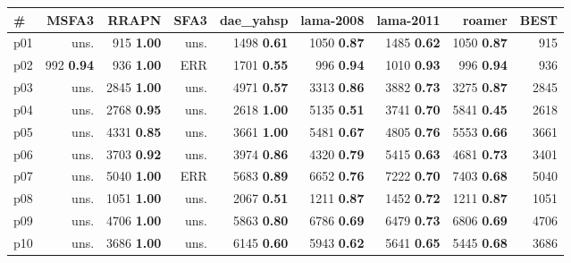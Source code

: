 \begin{tabular}{|l|rrrrrrr|r|}
\hline
\textbf{\#} & \textbf{MSFA3} & \textbf{RRAPN} & \textbf{SFA3} & \textbf{dae\_yahsp} & \textbf{lama-2008} & \textbf{lama-2011} & \textbf{roamer} & \textbf{BEST}\\
\hline
p01 & uns. & {\footnotesize 915} \textbf{1.00} & uns. & {\footnotesize 1498} \textbf{0.61} & {\footnotesize 1050} \textbf{0.87} & {\footnotesize 1485} \textbf{0.62} & {\footnotesize 1050} \textbf{0.87} & 915\\
p02 & {\footnotesize 992} \textbf{0.94} & {\footnotesize 936} \textbf{1.00} & ERR & {\footnotesize 1701} \textbf{0.55} & {\footnotesize 996} \textbf{0.94} & {\footnotesize 1010} \textbf{0.93} & {\footnotesize 996} \textbf{0.94} & 936\\
p03 & uns. & {\footnotesize 2845} \textbf{1.00} & uns. & {\footnotesize 4971} \textbf{0.57} & {\footnotesize 3313} \textbf{0.86} & {\footnotesize 3882} \textbf{0.73} & {\footnotesize 3275} \textbf{0.87} & 2845\\
p04 & uns. & {\footnotesize 2768} \textbf{0.95} & uns. & {\footnotesize 2618} \textbf{1.00} & {\footnotesize 5135} \textbf{0.51} & {\footnotesize 3741} \textbf{0.70} & {\footnotesize 5841} \textbf{0.45} & 2618\\
p05 & uns. & {\footnotesize 4331} \textbf{0.85} & uns. & {\footnotesize 3661} \textbf{1.00} & {\footnotesize 5481} \textbf{0.67} & {\footnotesize 4805} \textbf{0.76} & {\footnotesize 5553} \textbf{0.66} & 3661\\
p06 & uns. & {\footnotesize 3703} \textbf{0.92} & uns. & {\footnotesize 3974} \textbf{0.86} & {\footnotesize 4320} \textbf{0.79} & {\footnotesize 5415} \textbf{0.63} & {\footnotesize 4681} \textbf{0.73} & 3401\\
p07 & uns. & {\footnotesize 5040} \textbf{1.00} & ERR & {\footnotesize 5683} \textbf{0.89} & {\footnotesize 6652} \textbf{0.76} & {\footnotesize 7222} \textbf{0.70} & {\footnotesize 7403} \textbf{0.68} & 5040\\
p08 & uns. & {\footnotesize 1051} \textbf{1.00} & uns. & {\footnotesize 2067} \textbf{0.51} & {\footnotesize 1211} \textbf{0.87} & {\footnotesize 1452} \textbf{0.72} & {\footnotesize 1211} \textbf{0.87} & 1051\\
p09 & uns. & {\footnotesize 4706} \textbf{1.00} & uns. & {\footnotesize 5863} \textbf{0.80} & {\footnotesize 6786} \textbf{0.69} & {\footnotesize 6479} \textbf{0.73} & {\footnotesize 6806} \textbf{0.69} & 4706\\
p10 & uns. & {\footnotesize 3686} \textbf{1.00} & uns. & {\footnotesize 6145} \textbf{0.60} & {\footnotesize 5943} \textbf{0.62} & {\footnotesize 5641} \textbf{0.65} & {\footnotesize 5445} \textbf{0.68} & 3686\\

\end{tabular}
